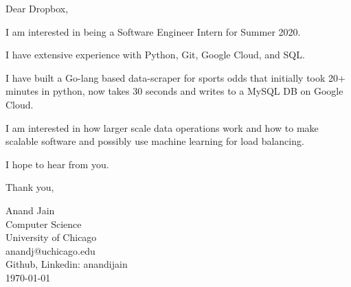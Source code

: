 \documentclass[11pt,a4paper,english]{letter} %
\begin{document}
Dear Dropbox,

I am interested in being a Software Engineer Intern for Summer 2020.

I have extensive experience with Python, Git, Google Cloud, and SQL.

I have built a Go-lang based data-scraper for sports odds that initially took 20+ minutes in python, now takes 30 seconds and writes to a MySQL DB on Google Cloud.

I am interested in how larger scale data operations work and how to make scalable software and possibly use machine learning for load balancing.

I hope to hear from you.

Thank you, 

Anand Jain\\
Computer Science\\
University of Chicago\\

anandj@uchicago.edu\\
Github, Linkedin: anandijain\\
\today\\
\end{document}
